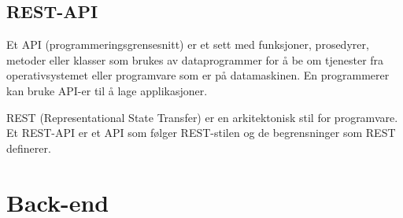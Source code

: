 
\subsection{REST-API}
Et API (programmeringsgrensesnitt) er et sett med funksjoner, prosedyrer, metoder eller klasser som brukes av dataprogrammer for å be om tjenester fra operativsystemet eller programvare som er på datamaskinen. En programmerer kan bruke API-er til å lage applikasjoner.

REST (Representational State Transfer) er en arkitektonisk stil for programvare. Et REST-API \cite{Masse2011radr} er et API som følger REST-stilen og de begrensninger som REST definerer.





\section{Back-end}
